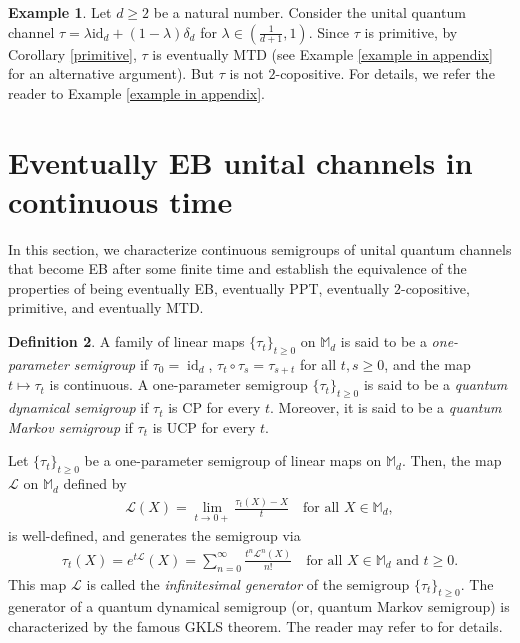 \documentclass[11pt,reqno]{amsart}
\theoremstyle{definition}
\newtheorem{defn}{Definition}[section]
\newtheorem{eg}[defn]{Example}
\theoremstyle{plain}
\theoremstyle{remark}
\numberwithin{equation}{section}%
\begin{document}
\begin{eg}\label{EMD:eg6}
	Let $d\geq 2$ be a natural number. Consider the unital quantum channel $\tau=\lambda\text{id}_d+(1-\lambda)\delta_d$ for $\lambda\in \left(\frac{1}{d+1},1\right)$. Since $\tau$ is primitive, by Corollary \ref{primitive}, $\tau$ is eventually MTD (see Example \ref{example in appendix} for an alternative argument). But $\tau$ is not $2$-copositive.  For details, we refer the reader to Example \ref{example in appendix}.
\end{eg}

  \section{Eventually EB  unital channels in continuous time}\label{continuous time}
   
  In this section, we characterize continuous semigroups of unital quantum channels that become EB after some finite time and establish the equivalence of the properties of being eventually EB, eventually PPT, eventually $2$-copositive, primitive, and eventually MTD.
  
  \begin{defn}
  	A family of linear maps $\{\tau_t\}_{t\geq 0}$ on $\mathbb{M}_d$ is said to be a \textit{one-parameter semigroup} if $\tau_0=\operatorname{id}_d$, $\tau_t\circ\tau_s=\tau_{s+t}$ for all $t,s\geq 0$, and the map $t\mapsto\tau_t$ is continuous. A one-parameter semigroup $\{\tau_t\}_{t\geq 0}$ is said to be a \textit{quantum dynamical semigroup} if $\tau_t$ is CP for every $t$. Moreover, it is said to be a \textit{quantum Markov semigroup} if $\tau_t$ is UCP for every $t$. 
  \end{defn}
  
  
  Let $\{\tau_t\}_{t\geq 0}$ be a one-parameter semigroup of linear maps on $\mathbb{M}_d$. Then, the map $\mathcal{L}$ on $\mathbb{M}_d$ defined by
  \begin{align*}
  	\mathcal{L}(X)=\lim_{t\rightarrow 0+}\frac{\tau_t(X)-X}{t}\quad\text{for all } X\in\mathbb{M}_d,
  \end{align*}
  is well-defined, and generates the semigroup via
  \begin{align*}
  	\tau_t(X)=e^{t\mathcal{L}}(X)=\sum_{n=0}^\infty\frac{t^n\mathcal{L}^n(X)}{n!}\quad\text{for all }X\in\mathbb{M}_d\text{ and }t\ge 0.
  \end{align*}
  This map $\mathcal{L}$ is called the \textit{infinitesimal generator} of the semigroup $\{\tau_t\}_{t\geq 0}$. The generator of a quantum dynamical semigroup (or, quantum Markov semigroup) is characterized by the famous GKLS theorem. The reader may refer to \cite{GKS,L} for details.
  
\end{document}
